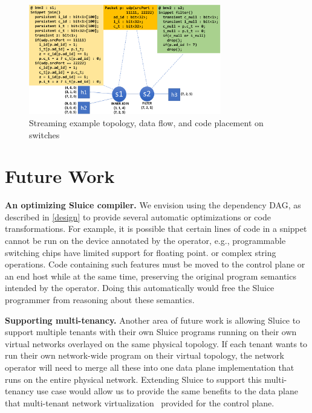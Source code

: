 \begin{figure}[tp]
\centering
\includegraphics[width=84mm]{figures/streaming_example}
\caption{Streaming example topology, data flow, and code placement on switches}
\vspace{-5mm}
\end{figure}
\vspace{-3mm}


\section{Future Work}
\textbf{An optimizing Sluice compiler.} We envision using the dependency DAG, as described in \ref{design} to
provide several automatic optimizations or code transformations. For example,
it is possible that certain lines of code in a snippet cannot be run on the
device annotated by the operator, e.g., programmable switching chips have
limited support for floating point. or complex string operations. Code
containing such features must be moved to the control plane or an end host while at the same time, preserving the original program semantics intended by the operator. Doing this automatically would free the Sluice programmer from reasoning about these semantics.

\textbf{Supporting multi-tenancy.} Another area of future work is allowing
Sluice to support multiple tenants with their own Sluice
programs running on their own virtual networks overlayed on the same physical
topology. If each tenant wants to run their own network-wide program on their
virtual topology, the network operator will need to merge all these into one
data plane implementation that runs on the entire physical network. Extending
Sluice to support this multi-tenancy use case would allow us to provide the
same benefits to the data plane that multi-tenant network
virtualization~\cite{multitenant} provided for the control plane.
